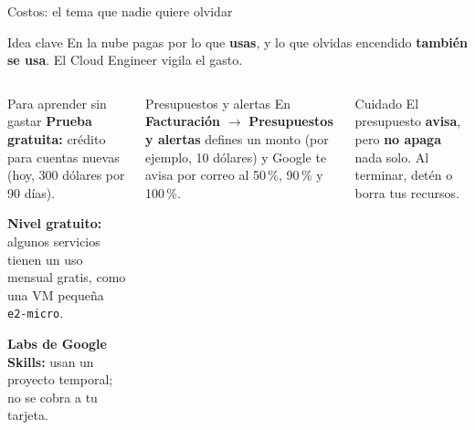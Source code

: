 \documentclass[aspectratio=169,10pt,c]{beamer}
\begin{document}
\begin{frame}{Costos: el tema que nadie quiere olvidar}
\begin{block}{Idea clave}
\small En la nube pagas por lo que \textbf{usas}, y lo que olvidas encendido \textbf{también se usa}. El Cloud Engineer vigila el gasto.
\end{block}
\begin{columns}[T,onlytextwidth]
\begin{exampleblock}{Para aprender sin gastar}
\small
\textbf{Prueba gratuita:} crédito para cuentas nuevas (hoy, 300 dólares por 90 días).\par\smallskip
\textbf{Nivel gratuito:} algunos servicios tienen un uso mensual gratis, como una VM pequeña \texttt{e2-micro}.\par\smallskip
\textbf{Labs de Google Skills:} usan un proyecto temporal; no se cobra a tu tarjeta.
\end{exampleblock}
\begin{block}{Presupuestos y alertas}
\small En \textbf{Facturación} $\rightarrow$ \textbf{Presupuestos y alertas} defines un monto (por ejemplo, 10 dólares) y Google te avisa por correo al 50\,\%, 90\,\% y 100\,\%.
\end{block}
\begin{alertblock}{Cuidado}
\small El presupuesto \textbf{avisa}, pero \textbf{no apaga} nada solo. Al terminar, detén o borra tus recursos.
\end{alertblock}
\end{columns}
\end{frame}
\end{document}
